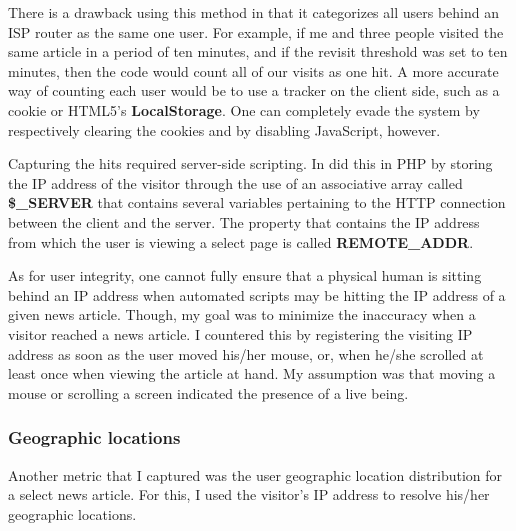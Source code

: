 \documentclass[12pt]{article}
\begin{document}
There is a drawback using this method in that it categorizes all users behind an ISP router as the same one user. For example, if me and three people visited the same article in a period of ten minutes, and if the revisit threshold was set to ten minutes, then the code would count all of our visits as one hit. A more accurate way of counting each user would be to use a tracker on the client side, such as a cookie or HTML5's \textbf{LocalStorage}. One can completely evade the system by respectively clearing the cookies and by disabling JavaScript, however. 

Capturing the hits required server-side scripting. In did this in PHP by storing the IP address of the visitor through the use of an associative array called \textbf{\$\_SERVER} that contains several variables pertaining to the HTTP connection between the client and the server. The property that contains the IP address from which the user is viewing a select page is called \textbf{REMOTE\_ADDR}. 

As for user integrity, one cannot fully ensure that a physical human is sitting behind an IP address when automated scripts may be hitting the IP address of a given news article. Though, my goal was to minimize the inaccuracy when a visitor reached a news article. I countered this by registering the visiting IP address as soon as the user moved his/her mouse, or, when he/she scrolled at least once when viewing the article at hand. My assumption was that moving a mouse or scrolling a screen indicated the presence of a live being. 

\newpage

\subsubsection{Geographic locations}
Another metric that I captured was the user geographic location distribution for a select news article. For this, I used the visitor's IP address to resolve his/her geographic locations.
\end{document}
